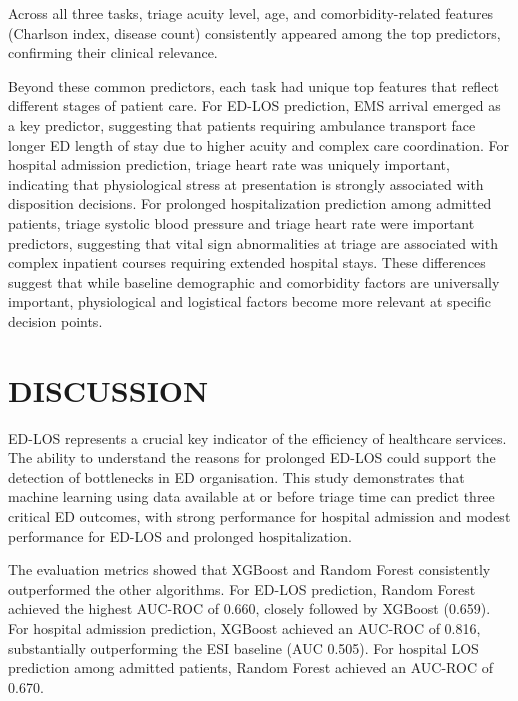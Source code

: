 \documentclass[harvard,article]{frontiersinFPHY_FAMS}
\begin{document}
Across all three tasks, triage acuity level, age, and comorbidity-related features (Charlson index, disease count) consistently appeared among the top predictors, confirming their clinical relevance.

Beyond these common predictors, each task had unique top features that reflect different stages of patient care. For ED-LOS prediction, EMS arrival emerged as a key predictor, suggesting that patients requiring ambulance transport face longer ED length of stay due to higher acuity and complex care coordination. For hospital admission prediction, triage heart rate was uniquely important, indicating that physiological stress at presentation is strongly associated with disposition decisions. For prolonged hospitalization prediction among admitted patients, triage systolic blood pressure and triage heart rate were important predictors, suggesting that vital sign abnormalities at triage are associated with complex inpatient courses requiring extended hospital stays. These differences suggest that while baseline demographic and comorbidity factors are universally important, physiological and logistical factors become more relevant at specific decision points.

\section{DISCUSSION}

ED-LOS represents a crucial key indicator of the efficiency of healthcare services. The ability to understand the reasons for prolonged ED-LOS could support the detection of bottlenecks in ED organisation. This study demonstrates that machine learning using data available at or before triage time can predict three critical ED outcomes, with strong performance for hospital admission and modest performance for ED-LOS and prolonged hospitalization.

The evaluation metrics showed that XGBoost and Random Forest consistently outperformed the other algorithms. For ED-LOS prediction, Random Forest achieved the highest AUC-ROC of 0.660, closely followed by XGBoost (0.659). For hospital admission prediction, XGBoost achieved an AUC-ROC of 0.816, substantially outperforming the ESI baseline (AUC 0.505). For hospital LOS prediction among admitted patients, Random Forest achieved an AUC-ROC of 0.670.
\end{document}
